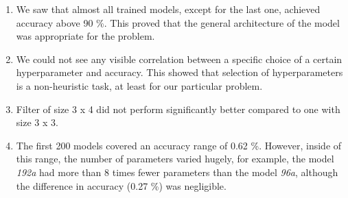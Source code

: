 \begin{enumerate}
    \item We saw that almost all trained models, except for the last one, achieved accuracy above 90 \%. This proved that the general architecture of the model was appropriate for the problem.
    \item We could not see any visible correlation between a specific choice of a certain hyperparameter and accuracy. This showed that selection of hyperparameters is a non-heuristic task, at least for our particular problem.
    \item Filter of size 3 x 4 did not perform significantly better compared to one with size 3 x 3. 
    \item The first 200 models covered an accuracy range of 0.62 \%. However, inside of this range, the number of parameters varied hugely, for example, the model \textit{192a} had more than 8 times fewer parameters than the model \textit{96a}, although the difference in accuracy (0.27 \%) was negligible.
\newline
\end{enumerate}
